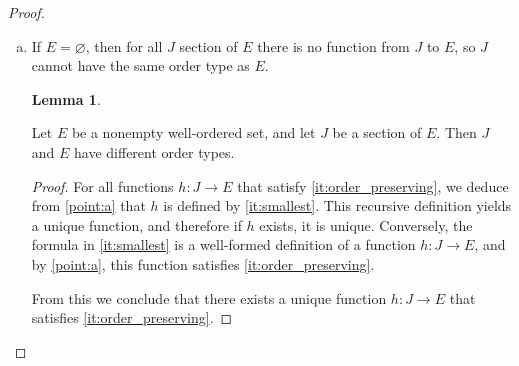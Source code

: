 \documentclass[11pt,a4paper,twoside]{article}
\theoremstyle{definition}
\newtheorem{lemma}{Lemma}
\begin{document}
\begin{proof}
\begin{enumerate}[(a)]
\begin{description}
\begin{itemize}
      \item If $\beta$ does not have an immediate predecessor, then $S_\beta = \cup_{\alpha < \beta} \,S_\alpha$. Since $S_\beta \subset J_0$,
        we have $\alpha \in J_0$ for all $\alpha < \beta$, and
        \begin{equation*}
          h ( S_\beta ) = h \left( \bigcup_{\alpha < \beta} \,S_\alpha \right) = \bigcup_{\alpha < \beta} \,h ( S_\alpha ) = \mathscr{S}
        \end{equation*}

        From \cref{lemma:union_of_sections}, we deduce that $\mathscr{S}$ is either $E$ or a section of $E$. And since
        $h ( \beta ) \in E - h ( S_\beta )$ exists for all $\beta \in J$, $\mathscr{S} = S_m$ for some $m \in E$. The element $m$ is the smallest
        upper bound for $h ( S_\beta )$ in $E$, and therefore $m = h ( \beta )$, and $\beta \in J_0$.

      \end{itemize}
      From the above, we deduce that $J_0$ is an inductive subset of $J$, and therefore $J_0 = J$.

    \end{description}

  \item If $E = \varnothing$, then for all $J$ section of $E$ there is no function from $J$ to $E$, so $J$ cannot have the
    same order type as $E$.

    \bigskip
    \begin{lemma}\label{lemma:section_order_type}

      Let $E$ be a nonempty well-ordered set, and let $J$ be a section of $E$. Then $J$ and $E$ have different order types.

    \end{lemma}

    \begin{proof}
      For all functions $h : J \to E$ that satisfy \ref{it:order_preserving}, we deduce from \ref{point:a} that $h$ is defined
      by \ref{it:smallest}. This recursive definition yields a unique function, and therefore if $h$ exists, it is unique.
      Conversely, the formula in \ref{it:smallest} is a well-formed definition of a function $h : J \to E$, and by \ref{point:a},
      this function satisfies \ref{it:order_preserving}.

      From this we conclude that there exists a unique function $h : J \to E$ that satisfies \ref{it:order_preserving}.


\end{proof}
\end{enumerate}
\end{proof}
\end{document}
